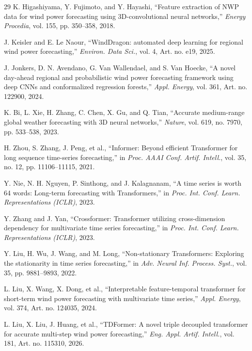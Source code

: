 \begin{thebibliography}{29}
K. Higashiyama, Y. Fujimoto, and Y. Hayashi, ``Feature extraction of NWP data for wind power forecasting using 3D-convolutional neural networks,'' \textit{Energy Procedia}, vol. 155, pp. 350--358, 2018.

J. Keisler and E. Le Naour, ``WindDragon: automated deep learning for regional wind power forecasting,'' \textit{Environ. Data Sci.}, vol. 4, Art. no. e19, 2025.

J. Jonkers, D. N. Avendano, G. Van Wallendael, and S. Van Hoecke, ``A novel day-ahead regional and probabilistic wind power forecasting framework using deep CNNs and conformalized regression forests,'' \textit{Appl. Energy}, vol. 361, Art. no. 122900, 2024.

K. Bi, L. Xie, H. Zhang, C. Chen, X. Gu, and Q. Tian, ``Accurate medium-range global weather forecasting with 3D neural networks,'' \textit{Nature}, vol. 619, no. 7970, pp. 533--538, 2023.

H. Zhou, S. Zhang, J. Peng, et al., ``Informer: Beyond efficient Transformer for long sequence time-series forecasting,'' in \textit{Proc. AAAI Conf. Artif. Intell.}, vol. 35, no. 12, pp. 11106--11115, 2021.

Y. Nie, N. H. Nguyen, P. Sinthong, and J. Kalagnanam, ``A time series is worth 64 words: Long-term forecasting with Transformers,'' in \textit{Proc. Int. Conf. Learn. Representations (ICLR)}, 2023.

Y. Zhang and J. Yan, ``Crossformer: Transformer utilizing cross-dimension dependency for multivariate time series forecasting,'' in \textit{Proc. Int. Conf. Learn. Representations (ICLR)}, 2023.

Y. Liu, H. Wu, J. Wang, and M. Long, ``Non-stationary Transformers: Exploring the stationarity in time series forecasting,'' in \textit{Adv. Neural Inf. Process. Syst.}, vol. 35, pp. 9881--9893, 2022.

L. Liu, X. Wang, X. Dong, et al., ``Interpretable feature-temporal transformer for short-term wind power forecasting with multivariate time series,'' \textit{Appl. Energy}, vol. 374, Art. no. 124035, 2024.

L. Liu, X. Liu, J. Huang, et al., ``TDFormer: A novel triple decoupled transformer for accurate multi-step wind power forecasting,'' \textit{Eng. Appl. Artif. Intell.}, vol. 181, Art. no. 115310, 2026.

\end{thebibliography}
